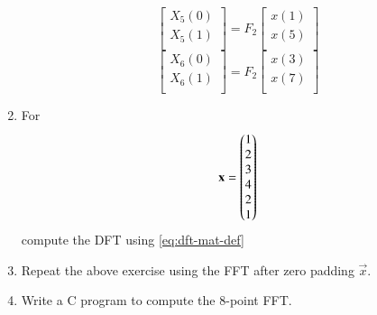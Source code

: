 \documentclass[journal,12pt,twocolumn]{IEEEtran}
\renewcommand\thesection{\arabic{section}}
\begin{document}
\begin{enumerate}[label=\arabic*.,ref=\thesection.\theenumi]
	\begin{equation}
		\begin{bmatrix}
			X_{5}(0) \\ 
			X_{5}(1)\\ 
		\end{bmatrix}
		= F_{2}
		\begin{bmatrix}
			x(1) \\ 
			x(5) \\ 
		\end{bmatrix}
	\end{equation}
	\begin{equation}
		\begin{bmatrix}
			X_{6}(0) \\ 
			X_{6}(1)\\ 
		\end{bmatrix}
		= F_{2}
		\begin{bmatrix}
			x(3) \\ 
			x(7) \\ 
		\end{bmatrix}
	\end{equation}
	\item For 
	\begin{align}
		\mathbf{x} = \begin{pmatrix}1\\2\\3\\4\\2\\1\end{pmatrix}
		\label{eq:equation1}
	\end{align}
	compute the DFT  
	using 
	\eqref{eq:dft-mat-def}
	\item Repeat the above exercise using the FFT
	after zero padding $\vec{x}$.
	\item Write a C program to compute the 8-point FFT. 
\end{enumerate}
\end{document}
